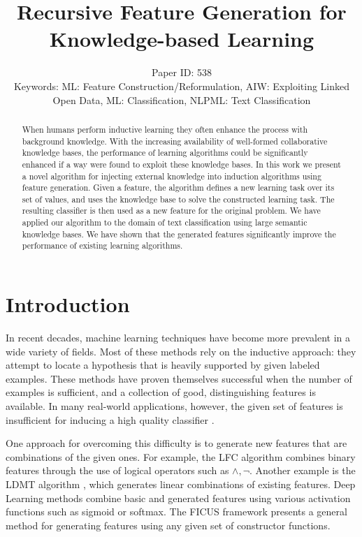 \documentclass[letterpaper]{article} %
\title{Recursive Feature Generation for Knowledge-based Learning}
\author{Paper ID: 538 \\
	Keywords: ML: Feature Construction/Reformulation, AIW: Exploiting Linked Open Data, ML: Classification, NLPML: Text Classification
}
\theoremstyle{definition}
\begin{document}
\maketitle
\begin{abstract}
	When humans perform inductive learning they often enhance the process with background knowledge.
	With the increasing availability of well-formed collaborative knowledge bases, the performance of learning algorithms could
	be significantly enhanced if a way were found to exploit these knowledge bases. 
	In this work we present a novel algorithm for injecting external knowledge into induction algorithms using feature generation. Given a feature, the algorithm defines a new learning task over its set of values, and uses the knowledge base to solve the constructed learning task. The resulting classifier is then used as a new feature for the original problem.
	We have applied our algorithm to the domain of text classification using large semantic knowledge bases. We have shown that the generated features significantly improve the performance of existing learning algorithms.
\end{abstract}

\section{Introduction}
\label{sec:Intro}
In recent decades, machine learning techniques have become more prevalent in a wide variety of fields. %
Most of these methods rely on the inductive approach: they attempt to locate a hypothesis that is heavily supported by given labeled examples. These methods have proven themselves successful when the number of examples is sufficient, and a collection of good,
distinguishing features is available.
In many real-world applications, however, the given set of features is insufficient for inducing a high quality classifier \cite{levi2004learning,paulheim2012unsupervisedfull}.

One approach for overcoming this difficulty is to generate new features that are combinations of the given ones.
For example, the LFC algorithm \cite{ragavan1993complex} combines binary features through the use of logical operators such as $\land ,\lnot$.
Another example is the LDMT algorithm \cite{utgo1991linear}, which generates linear combinations of existing features.
Deep Learning methods combine basic and generated features using various activation functions such as sigmoid or softmax.
The FICUS framework \cite{markovitch2002feature} presents a general method for generating features using any given set of constructor functions.
\end{document}
